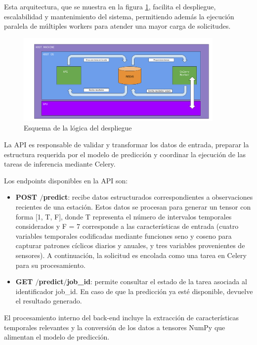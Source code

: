 Esta arquitectura, que se muestra en la figura \ref{deploy_scheme}, facilita el despliegue, escalabilidad y mantenimiento del sistema, permitiendo además la ejecución paralela de múltiples workers para atender una mayor carga de solicitudes.
\begin{figure}[H]
    \centering
    \includegraphics[width=0.9\textwidth]{images/esquema_despliegue.png}
    \caption{Esquema de la lógica del despliegue}
    \label{deploy_scheme}
\end{figure}

La API es responsable de validar y transformar los datos de entrada, preparar la estructura requerida por el modelo de predicción y coordinar la ejecución de las tareas de inferencia mediante Celery.

Los endpoints disponibles en la API son:

\begin{itemize}
    \item \textbf{POST $/$predict}:  recibe datos estructurados correspondientes a observaciones recientes de una estación. Estos datos se procesan para generar un tensor con forma [1, T, F], donde T representa el número de intervalos temporales considerados y F = 7 corresponde a las características de entrada (cuatro variables temporales codificadas mediante funciones seno y coseno para capturar patrones cíclicos diarios y anuales, y tres variables provenientes de sensores). A continuación, la solicitud es encolada como una tarea en Celery para su procesamiento.
    \item \textbf{GET $/$predict$/${job\_id}}: permite consultar el estado de la tarea asociada al identificador job\_id. En caso de que la predicción ya esté disponible, devuelve el resultado generado.
\end{itemize}
El procesamiento interno del back-end incluye la extracción de características temporales relevantes y la conversión de los datos a tensores NumPy que alimentan el modelo de predicción.


